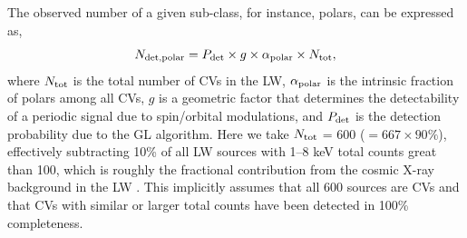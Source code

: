 \documentclass[fleqn,usenatbib]{mnras}
\begin{document}
The observed number of a given sub-class, for instance, polars, can be expressed as,
\begin{equation}
  N_{\rm det,polar} = P_{\rm det} \times g \times \alpha_{\rm polar} \times N_{\rm tot},
\end{equation}
where $N_{\rm tot}$ is the total number of CVs in the LW, $\alpha_{\rm polar}$ is the intrinsic fraction of polars among all CVs, $g$ is a geometric factor that determines the detectability of a periodic signal due to spin/orbital modulations, and $P_{\rm det}$ is the detection probability due to the GL algorithm. Here we take $N_{\rm tot}$ = 600 ($=667\times90\%$), effectively subtracting 10\% of all LW sources with 1--8 keV total counts great than 100, which is roughly the fractional contribution from the cosmic X-ray background in the LW \citep{2018ApJS..235...26Z}. This implicitly assumes that all 600 sources are CVs and that CVs with similar or larger total counts have been detected in 100\% completeness. 
\end{document}
